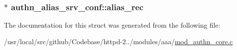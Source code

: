 \subsubsection[{\texorpdfstring{alias\+\_\+rec}{alias_rec}}]{$\ast$ authn\+\_\+alias\+\_\+srv\+\_\+conf\+::alias\+\_\+rec}\hypertarget{structauthn__alias__srv__conf_a035de3c208a21196ed5104c064dbea06}{}\label{structauthn__alias__srv__conf_a035de3c208a21196ed5104c064dbea06}


The documentation for this struct was generated from the following file\+:\begin{DoxyCompactItemize}
\item 
/usr/local/src/github/\+Codebase/httpd-\/2../modules/aaa/\hyperlink{mod__authn__core_8c}{mod\+\_\+authn\+\_\+core.\+c}\end{DoxyCompactItemize}
